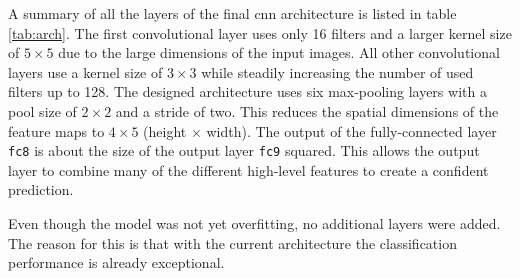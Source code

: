 A summary of all the layers of the final \acrshort{cnn} architecture is listed in table \ref{tab:arch}.
The first convolutional layer uses only \num{16} filters and a larger kernel size of $5\times 5$ due to the large dimensions of the input images.
All other convolutional layers use a kernel size of $3\times 3$ while steadily increasing the number of used filters up to \num{128}.
The designed architecture uses six max-pooling layers with a pool size of $2\times 2$ and a stride of two.
This reduces the spatial dimensions of the feature maps to $4\times 5$ (height $\times$ width).
The output of the fully-connected layer \texttt{fc8} is about the size of the output layer \texttt{fc9} squared.
This allows the output layer to combine many of the different high-level features to create a confident prediction.

Even though the model was not yet overfitting, no additional layers were added.
The reason for this is that with the current architecture the classification performance is already exceptional.

